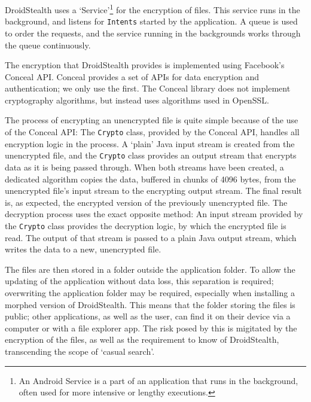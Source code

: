 DroidStealth uses a `Service'\footnote{An Android Service is a part of an application that runs in the background, often used for more intensive or lengthy executions.} for the encryption of files.
This service runs in the background, and listens for \texttt{Intents} started by the application.
A queue is used to order the requests, and the service running in the backgrounds works through the queue continuously.

The encryption that DroidStealth provides is implemented using Facebook's Conceal API\cite{facebookConceal}.
Conceal provides a set of APIs for data encryption and authentication; we only use the first.
The Conceal library does not implement cryptography algorithms, but instead uses algorithms used in OpenSSL\cite{openssl}.

The process of encrypting an unencrypted file is quite simple because of the use of the Conceal API:
The \texttt{Crypto} class, provided by the Conceal API, handles all encryption logic in the process.
A `plain' Java input stream is created from the unencrypted file, and the \texttt{Crypto} class provides an output stream that encrypts data as it is being passed through.
When both streams have been created, a dedicated algorithm copies the data, buffered in chunks of 4096 bytes, from the unencrypted file's input stream to the encrypting output stream.
The final result is, as expected, the encrypted version of the previously unencrypted file.
The decryption process uses the exact opposite method:
An input stream provided by the \texttt{Crypto} class provides the decryption logic, by which the encrypted file is read.
The output of that stream is passed to a plain Java output stream, which writes the data to a new, unencrypted file.

The files are then stored in a folder outside the application folder.
To allow the updating of the application without data loss, this separation is required; overwriting the application folder may be required, especially when installing a morphed version of DroidStealth.
This means that the folder storing the files is public; other applications, as well as the user, can find it on their device via a computer or with a file explorer app.
The risk posed by this is migitated by the encryption of the files, as well as the requirement to know of DroidStealth, transcending the scope of `casual search'.
